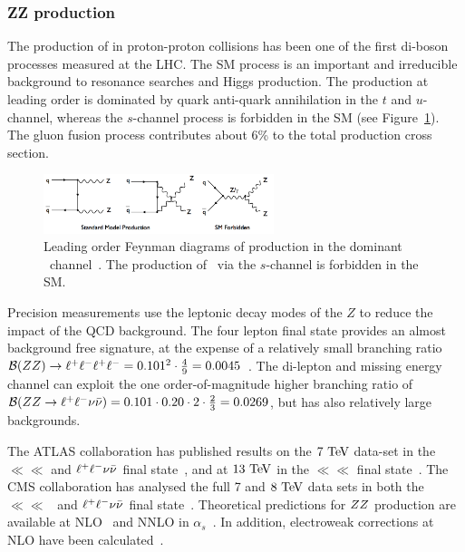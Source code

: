 \subsubsection{ZZ production}
\label{sss-ZZprod}

The production of \ZZ in proton-proton collisions has been one of the first di-boson 
processes measured at the LHC. The SM process is an important and irreducible
background to resonance searches and Higgs production. The production at leading
order is dominated by quark anti-quark annihilation in the $t$ and $u$-channel,
whereas the $s$-channel process is forbidden in the SM 
(see Figure~\ref{fig:sss-ZZprod-LOdiagrams}). The gluon fusion process 
contributes about 6\% to the total production cross section. 

\begin{figure}[htbp]
  \begin{center}
  \includegraphics[width=0.6\textwidth]{figures/sss-inclboson-diboson-zzprod-zzdiagram.png}
  \caption{Leading order Feynman diagrams of \ZZ production in the dominant 
  \qqbar\ channel~\cite{ATLAS-CONF-2012-026}. The production of \ZZ\ via the $s$-channel is forbidden in the SM.}
\label{fig:sss-ZZprod-LOdiagrams}
\end{center}
\end{figure}

Precision measurements use the leptonic decay modes of the $Z$ to reduce the impact of
the QCD background. 
The four lepton final state provides an almost background free signature, at the
expense of a relatively small branching ratio
$\mathcal{B}(ZZ) \to \ll\ll = 0.101^2 \cdot {4 \over 9} = 0.0045$~\cite{Agashe:2014kda}.  
The di-lepton and missing energy channel can exploit the one order-of-magnitude
higher branching ratio of 
$\mathcal{B}(\ZZ \to \ll\vv) = 0.101 \cdot 0.20 \cdot 2 \cdot {2 \over 3} = 0.0269$, 
but has also relatively large backgrounds.

The ATLAS collaboration has published results on the $7\TeV$ data-set 
in the $\ll\ll$ and $\ll\vv$ final state~\cite{Aad:2012awa}, and at
$13\TeV$ in the $\ll\ll$ final state~\cite{Aad:2015zqe}. The CMS collaboration
has analysed the full 7 and $8\TeV$ data sets in both 
the $\ll\ll$~\cite{Chatrchyan:2012sga,CMS:2014xja} and 
$\ll\vv$ final state~\cite{Khachatryan:2015pba}.
Theoretical predictions for $\ZZ$ production are available 
at NLO~\cite{Campbell:2011bn} and NNLO in $\alpha_s$~\cite{Cascioli:2014yka}. 
In addition, electroweak 
corrections at NLO have been calculated~\cite{Bierweiler:2013dja,Baglio:2013toa}. 

